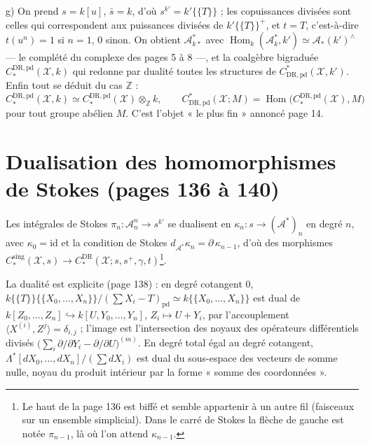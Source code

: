 \documentclass[11pt,a4paper]{article}
\begin{document}
g) On prend $s = k[u]$, $\bar s = k$, d'où $s^{k'} = k'\{\{T\}\}$ ; les
copuissances divisées sont celles qui correspondent aux puissances divisées de
$k'\{\{T\}\}^+$, et $t = T$, c'est-à-dire $t(u^n) = 1$ si $n = 1$, $0$ sinon. On
obtient $\mathcal{A}^*_{k*}$ avec $\operatorname{Hom}_k(\mathcal{A}^*_k, k') \simeq
\mathcal{A}_*(k')^\wedge$ — le complété du complexe des pages 5 à 8 —, et la
coalgèbre bigraduée $C^{\mathrm{DR,pd}}_*(\mathcal{X}, k)$ qui redonne par
dualité toutes les structures de $C^*_{\mathrm{DR,pd}}(\mathcal{X}, k')$. Enfin
tout se déduit du cas $\mathbb{Z}$ :
\[
C^{\mathrm{DR,pd}}_*(\mathcal{X}, k) \simeq C^{\mathrm{DR,pd}}_*(\mathcal{X}) \otimes_{\mathbb{Z}} k , \qquad C^*_{\mathrm{DR,pd}}(\mathcal{X}; M) = \operatorname{Hom}\bigl(C^{\mathrm{DR,pd}}_*(\mathcal{X}), M\bigr)
\]
pour tout groupe abélien $M$. C'est l'objet « le plus fin » annoncé page 14.

\section*{Dualisation des homomorphismes de Stokes (pages 136 à 140)}

Les intégrales de Stokes $\pi_n : \mathcal{A}^n_n \to s^{k'}$ se dualisent en
$\kappa_n : s \to (\mathcal{A}^*)_n$ en degré $n$, avec $\kappa_0 = \mathrm{id}$
et la condition de Stokes $d_{\mathcal{A}^*}\kappa_n = \partial\,\kappa_{n-1}$,
d'où des morphismes $C^{\mathrm{sing}}_*(\mathcal{X}, s) \to
C^{\mathrm{DR}}_*(\mathcal{X}; s, s^+, \gamma, t)$\footnote{Le haut de la page
136 est biffé et semble appartenir à un autre fil (faisceaux sur un ensemble
simplicial). Dans le carré de Stokes la flèche de gauche est notée
$\pi_{n-1}$, là où l'on attend $\kappa_{n-1}$.}.

La dualité est explicite (page 138) : en degré cotangent $0$,
$k\{\{T\}\}\{\{X_0,\ldots,X_n\}\}/(\sum X_i - T)_{\mathrm{pd}} \simeq
k\{\{X_0,\ldots,X_n\}\}$ est dual de $k[Z_0,\ldots,Z_n] \hookrightarrow
k[U, Y_0,\ldots,Y_n]$, $Z_i \mapsto U + Y_i$, par l'accouplement
$\langle X^{(i)}, Z^j\rangle = \delta_{i,j}$ ; l'image est l'intersection des
noyaux des opérateurs différentiels divisés $\bigl(\sum_i \partial/\partial Y_i
- \partial/\partial U\bigr)^{(m)}$. En degré total égal au degré cotangent,
$\Lambda^*[dX_0,\ldots,dX_n]/(\sum dX_i)$ est dual du sous-espace des vecteurs de
somme nulle, noyau du produit intérieur par la forme « somme des
coordonnées ».
\end{document}
